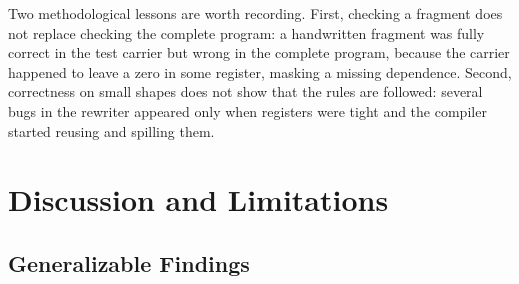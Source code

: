 \documentclass[sigconf,nonacm,balance=false]{acmart}
\begin{document}
Two methodological lessons are worth recording. First, checking a fragment does not replace checking the complete program: a handwritten fragment was fully correct in the test carrier but wrong in the complete program, because the carrier happened to leave a zero in some register, masking a missing dependence. Second, correctness on small shapes does not show that the rules are followed: several bugs in the rewriter appeared only when registers were tight and the compiler started reusing and spilling them.

\section{Discussion and Limitations}
\label{sec:9}

\subsection{Generalizable Findings}
\label{sec:9.1}
\end{document}
